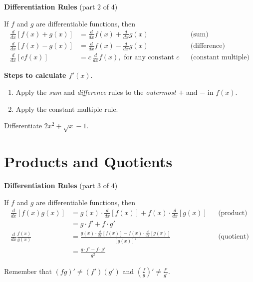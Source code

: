 \documentclass[../main.tex]{subfiles}
\begin{document}
\begin{mdframed}[style=simple]
  \textbf{Differentiation Rules} \hfill {\footnotesize (part \(2\) of \(4\))}

  If \(f\) and \(g\) are differentiable functions, then
  \begin{align*}
    \frac{d}{dx} [f(x) + g(x)] 
    &= \frac{d}{dx}f(x) + \frac{d}{dx}g(x)
    && \text{(sum)} \\[1em]
    \frac{d}{dx} [f(x) - g(x)] 
    &= \frac{d}{dx}f(x) - \frac{d}{dx}g(x)
    && \text{(difference)} \\[1em]
    \frac{d}{dx} [c f(x)] 
    &= c \, \frac{d}{dx} f(x), \text{ for any constant \(c\)}
    && \text{(constant multiple)}
  \end{align*}
\end{mdframed}

\textbf{Steps to calculate \(f'(x)\)}. 
\begin{enumerate}[label=(\arabic*)]
  \item Apply the \emph{sum} and \emph{difference} rules to the \emph{outermost} \(+\) and \(-\) in \(f(x)\). 
  \item Apply the constant multiple rule. 
\end{enumerate}
\bigskip

\begin{example}
  Differentiate \(2x^{2} + \sqrt{x} - 1\).
\end{example}
\vfill

\section{Products and Quotients}
\begin{mdframed}[style=simple]
  \textbf{Differentiation Rules} \hfill {\footnotesize (part \(3\) of \(4\))}

  If \(f\) and \(g\) are differentiable functions, then
  \begin{align*}
    \frac{d}{dx} [f(x)g(x)] 
    &= {g(x) \cdot \frac{d}{dx} [f(x)] + f(x) \cdot \frac{d}{dx}[g(x)]}
    && \text{(product)} \\
    &= g \cdot f' + f \cdot g' \\[1em]
    \frac{d}{dx} \frac{f(x)}{g(x)}
    &= {\frac{g(x) \cdot \frac{d}{dx} [f(x)] - f(x) \cdot \frac{d}{dx}[g(x)] }{ [g(x)]^{2} }}
    && \text{(quotient)} \\
    &= \frac{g \cdot f' - f \cdot g'}{g^{2}}
  \end{align*}
\end{mdframed}
\faExclamationTriangle{} Remember that \((fg)' \ne (f')(g')\) and \(\left(\frac{f}{g}\right)' \ne \frac{f'}{g'}\).
\end{document}
